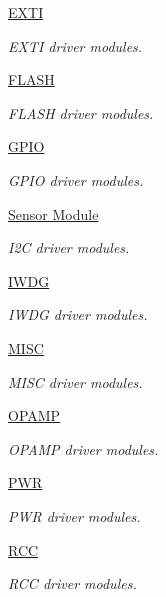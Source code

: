 \begin{DoxyCompactItemize}
\hyperlink{group___e_x_t_i}{E\-X\-T\-I}
\begin{DoxyCompactList}\small\item\em E\-X\-T\-I driver modules. \end{DoxyCompactList}\item 
\hyperlink{group___f_l_a_s_h}{F\-L\-A\-S\-H}
\begin{DoxyCompactList}\small\item\em F\-L\-A\-S\-H driver modules. \end{DoxyCompactList}\item 
\hyperlink{group___g_p_i_o}{G\-P\-I\-O}
\begin{DoxyCompactList}\small\item\em G\-P\-I\-O driver modules. \end{DoxyCompactList}\item 
\hyperlink{group___i2_c}{Sensor Module}
\begin{DoxyCompactList}\small\item\em I2\-C driver modules. \end{DoxyCompactList}\item 
\hyperlink{group___i_w_d_g}{I\-W\-D\-G}
\begin{DoxyCompactList}\small\item\em I\-W\-D\-G driver modules. \end{DoxyCompactList}\item 
\hyperlink{group___m_i_s_c}{M\-I\-S\-C}
\begin{DoxyCompactList}\small\item\em M\-I\-S\-C driver modules. \end{DoxyCompactList}\item 
\hyperlink{group___o_p_a_m_p}{O\-P\-A\-M\-P}
\begin{DoxyCompactList}\small\item\em O\-P\-A\-M\-P driver modules. \end{DoxyCompactList}\item 
\hyperlink{group___p_w_r}{P\-W\-R}
\begin{DoxyCompactList}\small\item\em P\-W\-R driver modules. \end{DoxyCompactList}\item 
\hyperlink{group___r_c_c}{R\-C\-C}
\begin{DoxyCompactList}\small\item\em R\-C\-C driver modules. \end{DoxyCompactList}\item 

\end{DoxyCompactItemize}
